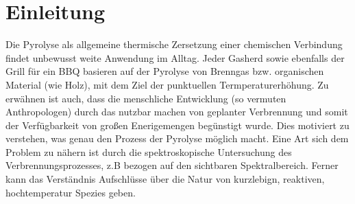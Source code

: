 


\section{Einleitung}
Die Pyrolyse als allgemeine thermische Zersetzung einer chemischen Verbindung findet unbewusst weite Anwendung im Alltag. Jeder Gasherd sowie ebenfalls der Grill für ein BBQ basieren auf der Pyrolyse von Brenngas bzw. organischen Material (wie Holz), mit dem Ziel der punktuellen Termperaturerhöhung. Zu erwähnen ist auch, dass die menschliche Entwicklung (so vermuten Anthropologen) durch das nutzbar machen von geplanter Verbrennung und somit der Verfügbarkeit von großen Enerigemengen begünstigt wurde. Dies motiviert zu verstehen, was genau den Prozess der Pyrolyse möglich macht. Eine Art sich dem Problem zu nähern ist durch die spektroskopische Untersuchung des Verbrennungsprozesses, z.B bezogen auf den sichtbaren Spektralbereich. Ferner kann das Verständnis Aufschlüsse über die Natur von kurzlebign, reaktiven, hochtemperatur Spezies geben.  

